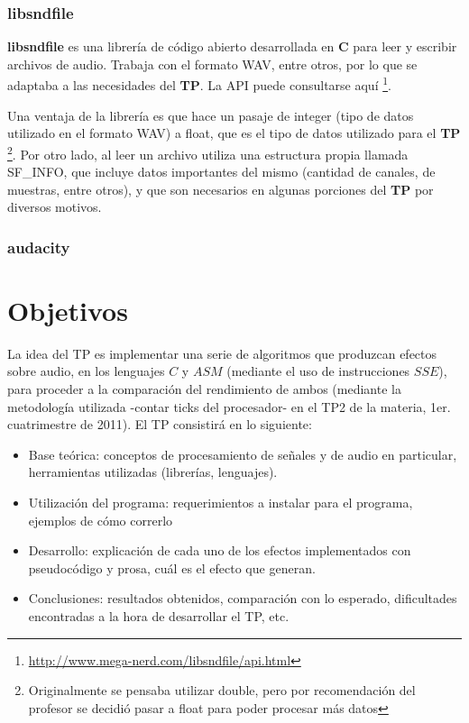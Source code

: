 \documentclass[a4paper,spanish,12pt]{article}
\begin{document}
\subsubsection{libsndfile}
\label{subsec:libsndfile}
\textbf{libsndfile} es una librería de código abierto desarrollada en \textbf{C} para leer y escribir archivos de audio. Trabaja con el formato WAV, entre otros, por lo que se adaptaba a las necesidades del \textbf{TP}. La API puede consultarse aquí \footnote{\url{http://www.mega-nerd.com/libsndfile/api.html}}.

Una ventaja de la librería es que hace un pasaje de integer (tipo de datos utilizado en el formato WAV) a float, que es el tipo de datos utilizado para el \textbf{TP} \footnote{Originalmente se pensaba utilizar double, pero por recomendación del profesor se decidió pasar a float para poder procesar más datos}. Por otro lado, al leer un archivo utiliza una estructura propia llamada SF_INFO, que incluye datos importantes del mismo (cantidad de canales, de muestras, entre otros), y que son necesarios en algunas porciones del \textbf{TP} por diversos motivos.

\subsubsection{audacity}
\label{subsec:audacity}


\section{Objetivos}
\indent La idea del TP es implementar una serie de algoritmos que produzcan efectos sobre audio, en los lenguajes $C$ y $ASM$ (mediante el uso de instrucciones $SSE$), para proceder a la comparación del rendimiento de ambos (mediante la metodología utilizada -contar ticks del procesador- en el TP2 de la materia, 1er. cuatrimestre de 2011). El TP consistirá en lo siguiente:
\begin{itemize}
\item Base teórica: conceptos de procesamiento de señales y de audio en particular, herramientas utilizadas (librerías, lenguajes).
\item Utilización del programa: requerimientos a instalar para el programa, ejemplos de cómo correrlo
\item Desarrollo: explicación de cada uno de los efectos implementados con pseudocódigo y prosa, cuál es el efecto que generan.
\item Conclusiones: resultados obtenidos, comparación con lo esperado, dificultades encontradas a la hora de desarrollar el TP, etc.
\end{itemize}
\end{document}
